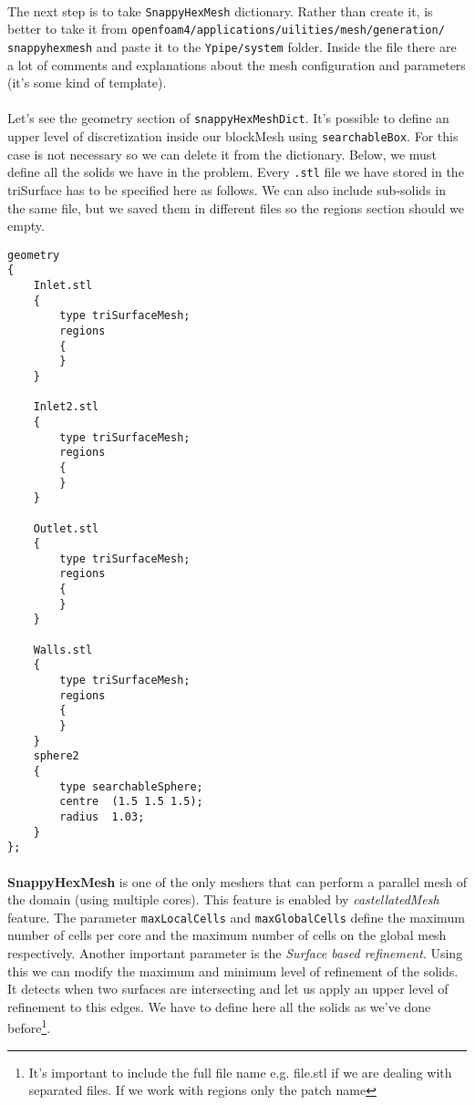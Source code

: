 \paragraph{}The next step is to take \texttt{SnappyHexMesh} dictionary. Rather than create it, is better to take it from \texttt{openfoam4/applications/uilities/mesh/generation/\\snappyhexmesh} and paste it to the \texttt{Ypipe/system} folder. Inside the file there are a lot of comments and explanations about the mesh configuration and parameters (it's some kind of template).

\paragraph{}Let's see the geometry section of \texttt{snappyHexMeshDict}. It's possible to define an upper level of discretization inside our blockMesh using \texttt{searchableBox}. For this case is not necessary so we can delete it from the dictionary. Below, we must define all the solids we have in the problem. Every \texttt{.stl} file we have stored in the triSurface has to be specified here as follows. We can also include sub-solids in the same file, but we saved them in different files so the regions section should we empty.
\begin{center}
\begin{lstlisting}
geometry
{
    Inlet.stl
    {
        type triSurfaceMesh;
        regions
        {
        }
    }

    Inlet2.stl
    {
        type triSurfaceMesh;
        regions
        {
        }
    }

    Outlet.stl
    {
        type triSurfaceMesh;
        regions
        {
        }
    }

    Walls.stl
    {
        type triSurfaceMesh;
        regions
        {
        }
    }
    sphere2
    {
        type searchableSphere;
        centre  (1.5 1.5 1.5);
        radius  1.03;
    }
};
\end{lstlisting}
\end{center}

\paragraph{}\textbf{SnappyHexMesh} is one of the only meshers that can perform a parallel mesh of the domain (using multiple cores). This feature is enabled by \emph{castellatedMesh} feature. The parameter \texttt{maxLocalCells} and \texttt{maxGlobalCells} define the maximum number of cells per core and the maximum number of cells on the global mesh respectively. Another important parameter is the \emph{Surface based refinement}. Using this we can modify the maximum and minimum level of refinement of the solids. It detects when two surfaces are intersecting and let us apply an upper level of refinement to this edges. We have to define here all the solids as we've done before\footnote{It's important to include the full file name e.g. file.stl if we are dealing with separated files. If we work with regions only the patch name}.


